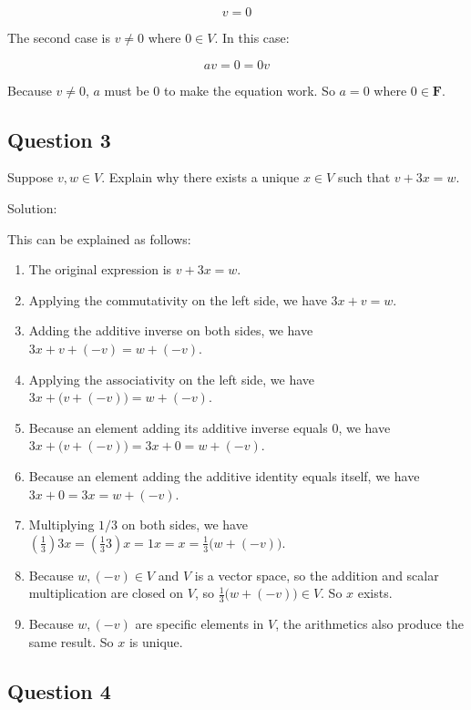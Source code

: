 \documentclass[12pt, letterpaper, oneside]{book}
\begin{document}
\[ v = 0 \]

The second case is $v \neq 0$ where $0 \in V$. In this case:

\[ av = 0 = 0v \]

Because $v \neq 0$, $a$ must be $0$ to make the equation work. So $a = 0$ where
$0 \in \mathbf{F}$.

\subsection{Question 3}

Suppose $v, w \in V$. Explain why there exists a unique $x \in V$ such that
$v + 3x = w$.

Solution:

This can be explained as follows:

\begin{enumerate}
  \item The original expression is $v + 3x = w$.
  \item Applying the commutativity on the left side, we have $3x + v = w$.
  \item Adding the additive inverse on both sides, we have $3x + v + (-v) =
          w + (-v)$.
  \item Applying the associativity on the left side, we have $3x + \bigl(v +
          (-v)\bigr) = w + (-v)$.
  \item Because an element adding its additive inverse equals $0$, we have
        $3x + \bigl(v + (-v)\bigr) = 3x + 0 = w + (-v)$.
  \item Because an element adding the additive identity equals itself, we have
        $3x + 0 = 3x = w + (-v)$.
  \item Multiplying $1/3$ on both sides, we have $(\frac{1}{3})3x =
          (\frac{1}{3}3)x = 1x = x = \frac{1}{3}\bigl(w + (-v)\bigr)$.
  \item Because $w, (-v) \in V$ and $V$ is a vector space, so the addition and
        scalar multiplication are closed on $V$, so $\frac{1}{3}\bigl(w +
          (-v)\bigr) \in V$. So $x$ exists.
  \item Because $w, (-v)$ are specific elements in $V$, the arithmetics also
        produce the same result. So $x$ is unique.
\end{enumerate}

\subsection{Question 4}
\end{document}
